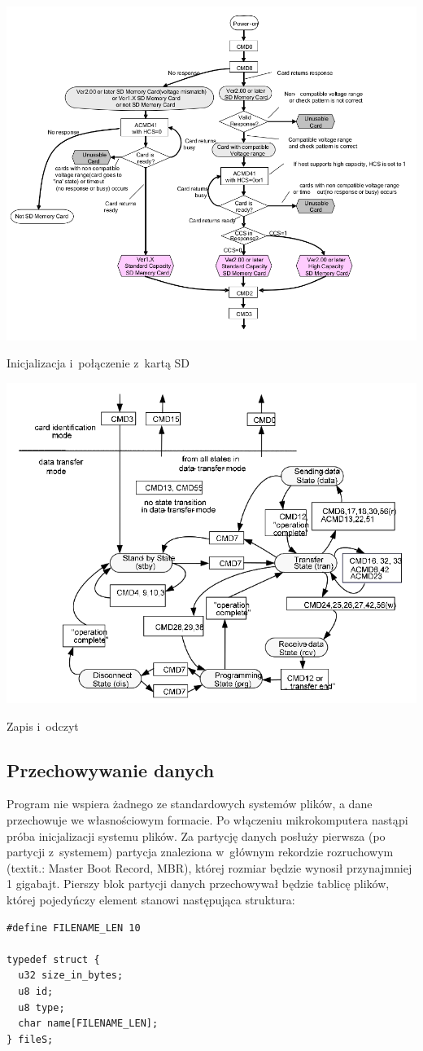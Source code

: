 \documentclass[shortabstract]{iithesis}
\begin{document}
\begingroup
\centering
\includegraphics[width=\textwidth]{sd-connection.png}
\captionsetup{type=figure}
\caption{Inicjalizacja i~połączenie z~kartą SD}
\endgroup

\begingroup
\centering
\includegraphics[width=\textwidth]{sd-transfer.png}
\captionsetup{type=figure}
\caption{Zapis i~odczyt}
\endgroup

\subsection{Przechowywanie danych}
Program nie wspiera żadnego ze standardowych systemów plików, a dane przechowuje we własnościowym formacie. Po włączeniu mikrokomputera nastąpi próba inicjalizacji systemu plików. Za partycję danych posłuży pierwsza (po partycji z~systemem) partycja znaleziona w~głównym rekordzie rozruchowym (textit{.: Master Boot Record, MBR}), której rozmiar będzie wynosił przynajmniej 1 gigabajt. Pierszy blok partycji danych przechowywał będzie tablicę plików, której pojedyńczy element stanowi następująca struktura:
\begin{verbatim}
#define FILENAME_LEN 10

typedef struct {
  u32 size_in_bytes;
  u8 id;
  u8 type;
  char name[FILENAME_LEN];
} fileS;
\end{verbatim}
\end{document}
